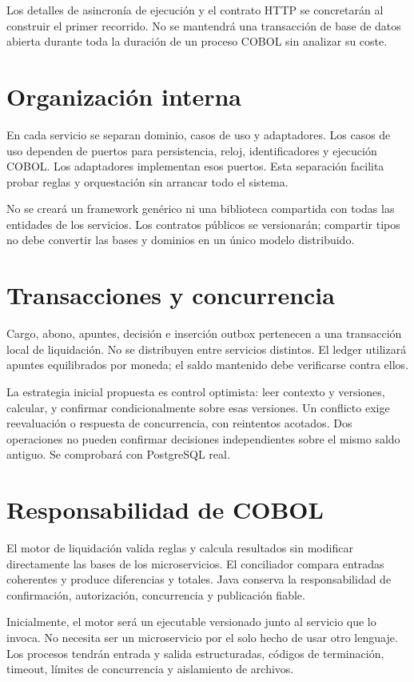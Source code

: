 Los detalles de asincronía de ejecución y el contrato HTTP se concretarán al construir el primer recorrido. No se mantendrá una transacción de base de datos abierta durante toda la duración de un proceso COBOL sin analizar su coste.

\section{Organización interna}
En cada servicio se separan dominio, casos de uso y adaptadores. Los casos de uso dependen de puertos para persistencia, reloj, identificadores y ejecución COBOL. Los adaptadores implementan esos puertos. Esta separación facilita probar reglas y orquestación sin arrancar todo el sistema.

No se creará un framework genérico ni una biblioteca compartida con todas las entidades de los servicios. Los contratos públicos se versionarán; compartir tipos no debe convertir las bases y dominios en un único modelo distribuido.

\section{Transacciones y concurrencia}
Cargo, abono, apuntes, decisión e inserción outbox pertenecen a una transacción local de liquidación. No se distribuyen entre servicios distintos. El ledger utilizará apuntes equilibrados por moneda; el saldo mantenido debe verificarse contra ellos.

La estrategia inicial propuesta es control optimista: leer contexto y versiones, calcular, y confirmar condicionalmente sobre esas versiones. Un conflicto exige reevaluación o respuesta de concurrencia, con reintentos acotados. Dos operaciones no pueden confirmar decisiones independientes sobre el mismo saldo antiguo. Se comprobará con PostgreSQL real.

\section{Responsabilidad de COBOL}
El motor de liquidación valida reglas y calcula resultados sin modificar directamente las bases de los microservicios. El conciliador compara entradas coherentes y produce diferencias y totales. Java conserva la responsabilidad de confirmación, autorización, concurrencia y publicación fiable.

Inicialmente, el motor será un ejecutable versionado junto al servicio que lo invoca. No necesita ser un microservicio por el solo hecho de usar otro lenguaje. Los procesos tendrán entrada y salida estructuradas, códigos de terminación, timeout, límites de concurrencia y aislamiento de archivos.

